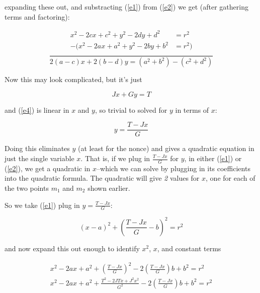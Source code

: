 \documentclass[12pt]{article}
\begin{document}

expanding these out, and substracting (\ref{e1}) from
(\ref{e2}) we get (after gathering terms and factoring):

\begin{equation}
\frac{\begin{aligned}
	x^2-2cx+c^2+y^2-2dy+d^2&=r^2\\
      -(x^2-2ax+a^2+y^2-2by+b^2&=r^2)\\
      \end{aligned}}{2(a-c)x+2(b-d)y=(a^2+b^2)-(c^2+d^2)}
\end{equation}

Now this may look complicated, but it's just

\begin{equation}
Jx+Gy=T
\label{e4}
\end{equation}

and (\ref{e4}) is linear in $x$ and $y$, so trivial to solved for
$y$ in terms of $x$:

\begin{equation}
y = \frac{T-Jx}{G}
\label{eq5}
\end{equation}

Doing this eliminates $y$ (at least for the nonce) and gives a quadratic
equation in just the single variable $x$. That is, if we plug in
$\frac{T-Jx}{G}$ for $y$, in either (\ref{e1}) or (\ref{e2}), we get a
quadratic in $x$--which we can solve by plugging in its coefficients
into the quadratic formula.  The quadratic will give {\em 2} values for
$x$, one for each of the two points $m_1$ and $m_2$ shown earlier.

So we take (\ref{e1}) plug in $y = \frac{T-Jx}{G}$:

\begin{equation}
{(x-a)}^2+{\left(\frac{T-Jx}{G}-b\right)}^2=r^2
\label{eq6}
\end{equation}

and now expand this out enough to identify $x^2$, $x$, and constant
terms

\begin{gather}
x^2-2ax+a^2+{\left(\frac{T-Jx}{G}\right)}^2
-2\left(\frac{T-Jx}{G}\right)b+b^2=r^2\\
x^2-2ax+a^2+\frac{T^2-2JTx+J^2x^2}{G^2}
-2\left(\frac{T-Jx}{G}\right)b+b^2=r^2
\end{gather}
\end{document}
